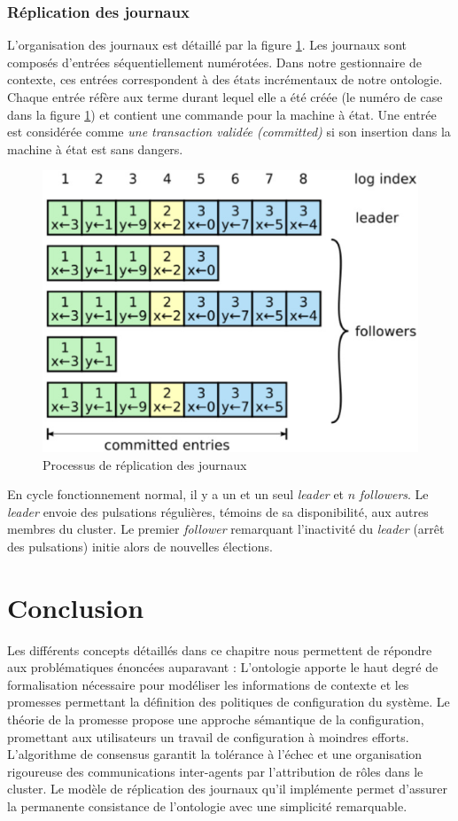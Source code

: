 \subsubsection{Réplication des journaux}

L'organisation des journaux est détaillé par la figure
\ref{fig:log_replication}.  Les journaux sont composés d'entrées
séquentiellement numérotées. Dans notre gestionnaire de contexte, ces entrées
correspondent à des états incrémentaux de notre ontologie. Chaque entrée réfère aux terme
durant lequel elle a été créée (le numéro de case dans la figure
\ref{fig:log_replication}) et contient une commande pour la machine à état. Une
entrée est considérée comme \emph{une transaction validée (committed)} si son
insertion dans la machine à état est sans dangers.

\begin{figure}[H]
    \centerline{\includegraphics[width=.37\textwidth]{img/log_replication}}
    \caption{Processus de réplication des journaux}
    \label{fig:log_replication}
\end{figure}

En cycle fonctionnement normal, il y a un et un seul \emph{leader} et $n$
\emph{followers}. Le \emph{leader} envoie des pulsations régulières, témoins de
sa disponibilité, aux autres membres du cluster. Le premier \emph{follower}
remarquant l'inactivité du \emph{leader} (arrêt des pulsations) initie alors de
nouvelles élections. 

\section{Conclusion}

Les différents concepts détaillés dans ce chapitre nous permettent de répondre
aux problématiques énoncées auparavant : L'ontologie apporte le haut degré de
formalisation nécessaire pour modéliser les informations de contexte et les
promesses permettant la définition des politiques de configuration du système.
Le théorie de la promesse propose une approche sémantique de la configuration,
promettant aux utilisateurs un travail de configuration à moindres efforts.
L'algorithme de consensus garantit la tolérance à l'échec et une organisation
rigoureuse des communications inter-agents par l'attribution de rôles dans le
cluster. Le modèle de réplication des journaux qu'il implémente permet d'assurer
la permanente consistance de l'ontologie avec une simplicité remarquable.

